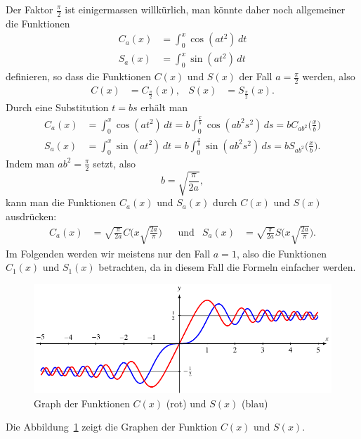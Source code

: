 Der Faktor $\frac{\pi}2$ ist einigermassen willkürlich, man könnte
daher noch allgemeiner die Funktionen
\begin{align*}
C_a(x) &= \int_0^x \cos(at^2)\,dt
\\
S_a(x) &= \int_0^x \sin(at^2)\,dt
\end{align*}
definieren, so dass die Funktionen $C(x)$ und $S(x)$ der Fall
$a=\frac{\pi}2$ werden, also
\[
\begin{aligned}
C(x) &= C_{\frac{\pi}2}(x),
&
S(x) &= S_{\frac{\pi}2}(x).
\end{aligned}
\]
Durch eine Substitution $t=bs$ erhält man
\begin{align*}
C_a(x)
&=
\int_0^x \cos(at^2)\,dt
=
b
\int_0^{\frac{x}b} \cos(ab^2s^2)\,ds
=
b
C_{ab^2}\biggl(\frac{x}b\biggr)
\\
S_a(x)
&=
\int_0^x \sin(at^2)\,dt
=
b
\int_0^{\frac{x}b} \sin(ab^2s^2)\,ds
=
b
S_{ab^2}\biggl(\frac{x}b\biggr).
\end{align*}
Indem man $ab^2=\frac{\pi}2$ setzt, also
\[
b
=
\sqrt{\frac{\pi}{2a}}
,
\]
kann man die Funktionen $C_a(x)$ und $S_a(x)$ durch $C(x)$ und $S(x)$
ausdrücken:
\begin{align}
C_a(x)
&=
\sqrt{\frac{\pi}{2a}}
C\biggl(x
\sqrt{\frac{2a}{\pi}}
\biggr)
&&\text{und}&
S_a(x)
&=
\sqrt{\frac{\pi}{2a}}
S\biggl(x
\sqrt{\frac{2a}{\pi}}
\biggr).
\label{fresnel:equation:arg}
\end{align}
Im Folgenden werden wir meistens nur den Fall $a=1$, also die Funktionen
$C_1(x)$ und $S_1(x)$ betrachten, da in diesem Fall die Formeln einfacher
werden.
\begin{figure}
\centering
\includegraphics{papers/fresnel/images/fresnelgraph.pdf}
\caption{Graph der Funktionen $C(x)$ ({\color{red}rot}) 
und $S(x)$ ({\color{blue}blau})
\label{fresnel:figure:plot}}
\end{figure}
Die Abbildung~\ref{fresnel:figure:plot} zeigt die Graphen der
Funktion $C(x)$ und $S(x)$.

